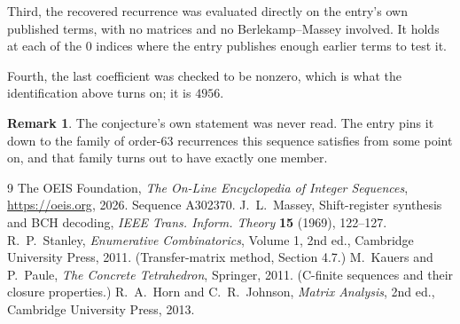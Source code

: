 \documentclass[11pt,a4paper]{article}
\theoremstyle{plain}
\theoremstyle{definition}
\newtheorem{remark}[theorem]{Remark}
\begin{document}
Third, the recovered recurrence was evaluated directly on the entry's own published terms, with
no matrices and no Berlekamp--Massey involved. It holds at each of the $0$ indices where
the entry publishes enough earlier terms to test it.

Fourth, the last coefficient was checked to be nonzero, which is what the identification above
turns on; it is $4956$.

\begin{remark}
The conjecture's own statement was never read. The entry pins it down to the family of
order-$63$ recurrences this sequence satisfies from some point on, and that family turns
out to have exactly one member.
\end{remark}

\begin{thebibliography}{9}
 The OEIS Foundation, \emph{The On-Line Encyclopedia of Integer
Sequences}, \url{https://oeis.org}, 2026. Sequence A302370.
 J.~L.~Massey, Shift-register synthesis and BCH decoding, \emph{IEEE
Trans. Inform. Theory} \textbf{15} (1969), 122--127.
 R.~P.~Stanley, \emph{Enumerative Combinatorics}, Volume 1, 2nd ed.,
Cambridge University Press, 2011. (Transfer-matrix method, Section 4.7.)
 M.~Kauers and P.~Paule, \emph{The Concrete Tetrahedron}, Springer, 2011.
(C-finite sequences and their closure properties.)
 R.~A.~Horn and C.~R.~Johnson, \emph{Matrix Analysis}, 2nd ed., Cambridge
University Press, 2013.
\end{thebibliography}
\end{document}
